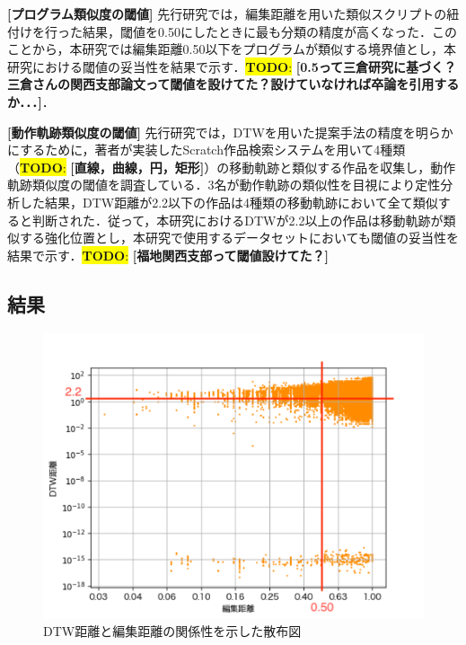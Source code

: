 \documentclass[T,J]{fose} %
\newcommand{\todo}[1]{\colorbox{yellow}{{\bf TODO}:}{\color{red} {\textbf{[#1]}}}}
\begin{document}
\noindent\textbf{[プログラム類似度の閾値] }先行研究では，編集距離を用いた類似スクリプトの紐付けを行った結果，閾値を0.50にしたときに最も分類の精度が高くなった．このことから，本研究では編集距離0.50以下をプログラムが類似する境界値とし，本研究における閾値の妥当性を結果で示す．\todo{0.5って三倉研究に基づく？三倉さんの関西支部論文って閾値を設けてた？設けていなければ卒論を引用するか．．．}．

\noindent\textbf{[動作軌跡類似度の閾値] }先行研究では，DTWを用いた提案手法の精度を明らかにするために，著者が実装したScratch作品検索システムを用いて4種類（\todo{直線，曲線，円，矩形}）の移動軌跡と類似する作品を収集し，動作軌跡類似度の閾値を調査している．3名が動作軌跡の類似性を目視により定性分析した結果，DTW距離が2.2以下の作品は4種類の移動軌跡において全て類似すると判断された．従って，本研究におけるDTWが2.2以上の作品は移動軌跡が類似する強化位置とし，本研究で使用するデータセットにおいても閾値の妥当性を結果で示す．\todo{福地関西支部って閾値設けてた？}


\subsection{結果}

\begin{figure}[t]
	\centering
	\includegraphics[width=1.0\linewidth]{Okamoto_fig/out-all-nolimit.pdf}
	\caption{DTW距離と編集距離の関係性を示した散布図}
	\label{fig:out-nolimit}
\end{figure}
\end{document}
